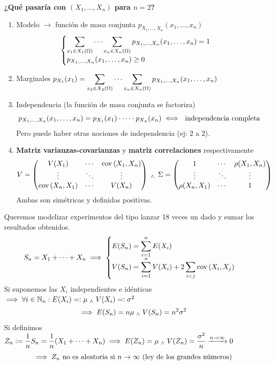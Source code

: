 \textbf{¿Qué pasaría con $(X_1, \dots, X_n)$ para $n=2$?}
\begin{enumerate}
	\item Modelo $\longrightarrow$ función de masa conjunta $p_{X_1, \dots, X_n} (x_1,
		      \dots, x_n)$
	      \[\begin{cases}
			      \displaystyle \sum_{x_1\in X_1(\Omega)}\cdots\sum_{x_n\in X_n(\Omega)} p_{X_1, \dots, X_n} (x_1, \dots, x_n) = 1 \\
			      p_{X_1, \dots, X_n} (x_1, \dots, x_n) \geq 0
		      \end{cases}\]
	\item Marginales $\displaystyle p_{X_1}(x_1)=\sum_{x_2 \in X_2(\Omega)} \cdots \sum_{x_n \in
			      X_n(\Omega)} p_{X_1, \dots, X_n} (x_1, \dots, x_n)$
	\item Independencia (la función de masa conjunta se factoriza)
	      \[p_{X_1, \dots, X_n} (x_1, \dots, x_n) = p_{X_1}(x_1) \cdot \cdots \cdot p_{X_n}(x_n) \iff \text{ independencia completa}\]
	      Pero puede haber otras nociones de independencia (ej: $2$ a $2$).
	\item \textbf{Matriz varianzas-covarianzas} y \textbf{matriz correlaciones} respectivamente
	      \[V = \begin{pmatrix}
			      V(X_1)         & \cdots & \operatorname{cov}\left(X_1, X_n\right) \\
			      \vdots         & \ddots & \vdots         \\
			      \operatorname{cov}\left(X_n, X_1\right) & \cdots & V(X_n)
		      \end{pmatrix} \; _{\wedge} \; \, \Sigma = \begin{pmatrix}
			      1              & \cdots & \rho(X_1, X_n) \\
			      \vdots         & \ddots & \vdots         \\
			      \rho(X_n, X_1) & \cdots & 1
		      \end{pmatrix}\]
	      Ambas son simétricas y definidas positivas.
\end{enumerate}
\begin{ejem}
	Queremos modelizar experimentos del tipo lanzar 18 veces un dado y sumar los resultados obtenidos.
	\[S_n=X_1+\cdots+X_n \implies \begin{cases}
			\displaystyle E(S_n) = \sum_{i=1}^n E(X_i) \\
			\displaystyle V(S_n) = \sum_{i=1}^n V(X_i) + 2\sum_{i<j} \operatorname{cov}\left(X_i, X_j\right)
		\end{cases}\]
	Si suponemos las $X_i$ independientes e idénticas $\implies \forall i \in \mathbb{N}_n : E(X_i)=\vcentcolon \mu \; _{\wedge} \; V(X_i)=\vcentcolon \sigma^2$
	\[\implies E(S_n) = n\mu \; _{\wedge} \; V(S_n)=n^2\sigma^2\]
	Si definimos $\displaystyle Z_n \vcentcolon= \frac{1}{n}S_n=\frac{1}{n}(X_1 + \cdots + X_n) \implies E(Z_n)=\mu \; _{\wedge} \; V(Z_n)=\frac{\sigma^2}{n} \xrightarrow{n\to\infty} 0$
	\[\implies Z_n \text{ no es aleatoria si } n\to\infty \text{ (ley de los grandes números)}\]
\end{ejem}
